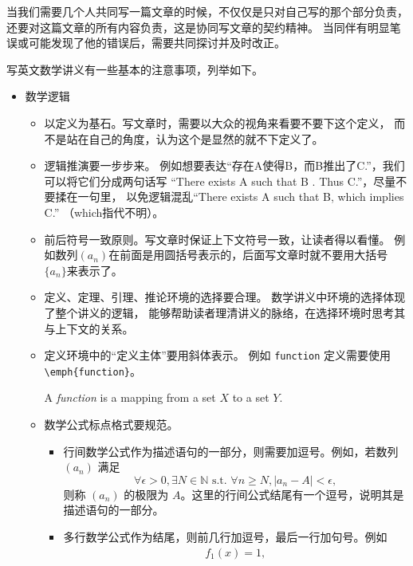当我们需要几个人共同写一篇文章的时候，不仅仅是只对自己写的那个部分负责，
还要对这篇文章的所有内容负责，这是协同写文章的契约精神。 
当同伴有明显笔误或可能发现了他的错误后，需要共同探讨并及时改正。

写英文数学讲义有一些基本的注意事项，列举如下。

\begin{itemize}
  \item 数学逻辑
  \begin{itemize}
  	\item 以定义为基石。写文章时，需要以大众的视角来看要不要下这个定义，
  	而不是站在自己的角度，认为这个是显然的就不下定义了。
  	\item 逻辑推演要一步步来。 例如想要表达“存在A使得B，而B推出了C.”，我们可以将它们分成两句话写
  	“There exists A such that B . Thus C.”，尽量不要揉在一句里，
  	以免逻辑混乱“There exists A such that B, which implies C.” （which指代不明）。
  	\item 前后符号一致原则。写文章时保证上下文符号一致，让读者得以看懂。
  	例如数列$(a_n)$在前面是用圆括号表示的，后面写文章时就不要用大括号$\{a_n\}$来表示了。
  	\item 定义、定理、引理、推论环境的选择要合理。
  	数学讲义中环境的选择体现了整个讲义的逻辑，
  	能够帮助读者理清讲义的脉络，在选择环境时思考其与上下文的关系。
  	\item 定义环境中的“定义主体”要用斜体表示。
  	例如 \lstinline|function| 定义需要使用 \lstinline|\emph{function}|。
  	\begin{definition}
  		\label{def:function}
  		\textnormal{A \emph{function} is a mapping from a set $X$ to a set $Y$.}
  	\end{definition}
    \item 数学公式标点格式要规范。
    \begin{itemize}
  	  \item 行间数学公式作为描述语句的一部分，则需要加逗号。例如，若数列 $(a_n)$ 满足
  	  \begin{equation}
  		  \label{eq:punctation1}
  		  \forall \epsilon > 0, \exists N \in \mathbb{N} \text{ s.t. } 
  		  \forall n \geq N, |a_n - A| < \epsilon,
  	  \end{equation}
  	  则称 $(a_n)$ 的极限为 $A$。这里的行间公式结尾有一个逗号，说明其是描述语句的一部分。
  	  \item 多行数学公式作为结尾，则前几行加逗号，最后一行加句号。例如
  	  \begin{align}
  		  \label{eq:punctation2}
  		  f_1(x) = 1, \\

\end{align}
\end{itemize}
\end{itemize}
\end{itemize}
